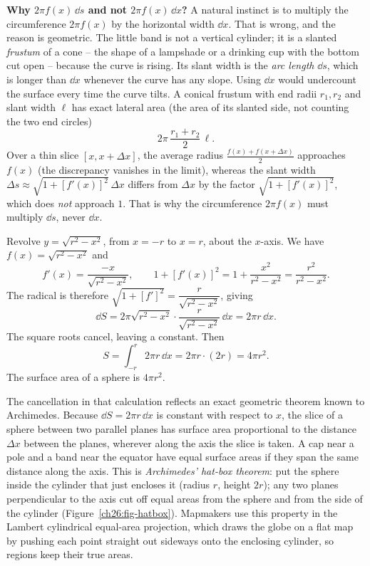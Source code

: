 \begin{whybox}
\textbf{Why $2\pi f(x)\,\dd s$ and not $2\pi f(x)\,\dd x$?} A natural instinct is
to multiply the circumference $2\pi f(x)$ by the horizontal width $\dd x$. That is
wrong, and the reason is geometric. The little band is not a vertical cylinder; it
is a slanted \emph{frustum} of a cone -- the shape of a lampshade or a drinking cup
with the bottom cut open -- because the curve is rising. Its slant width is the
\emph{arc length} $\dd s$, which is longer than $\dd x$ whenever the curve has any
slope. Using $\dd x$ would undercount the surface every time the curve tilts.
A conical frustum with end radii $r_1, r_2$ and slant width $\ell$ has exact
lateral area (the area of its slanted side, not counting the two end circles)
\[
  2\pi\,\frac{r_1+r_2}{2}\,\ell .
\]
Over a thin slice $[x, x+\Delta x]$, the
average radius $\frac{f(x)+f(x+\Delta x)}{2}$ approaches $f(x)$ (the discrepancy
vanishes in the limit), whereas the slant width $\Delta s \approx \sqrt{1+[f'(x)]^2}\,\Delta x$
differs from $\Delta x$ by the factor $\sqrt{1+[f'(x)]^2}$, which does \emph{not}
approach $1$. That is why the circumference $2\pi f(x)$ must multiply $\dd s$, never
$\dd x$.
\end{whybox}

\begin{example}
\label{ch26:ex-sphere-surface}
Revolve $y = \sqrt{r^2-x^2}$, from $x=-r$ to $x=r$, about the $x$-axis. We have
$f(x)=\sqrt{r^2-x^2}$ and
\[
  f'(x) = \frac{-x}{\sqrt{r^2-x^2}}, \qquad
  1+[f'(x)]^2 = 1 + \frac{x^2}{r^2-x^2} = \frac{r^2}{r^2-x^2}.
\]
The radical is therefore $\sqrt{1+[f']^2} = \dfrac{r}{\sqrt{r^2-x^2}}$, giving
\[
  \dd S = 2\pi\sqrt{r^2-x^2}\cdot\frac{r}{\sqrt{r^2-x^2}}\,\dd x = 2\pi r\,\dd x.
\]
The square roots cancel, leaving a constant. Then
\[
  S = \int_{-r}^{r} 2\pi r\,\dd x = 2\pi r\cdot(2r) = 4\pi r^2.
\]
The surface area of a sphere is $4\pi r^2$.
\end{example}

\begin{aestheticbox}
The cancellation in that calculation reflects an exact geometric theorem known
to Archimedes. Because $\dd S = 2\pi r\,\dd x$ is constant with respect to $x$, the
slice of a sphere between two parallel planes has surface area proportional to the
distance $\Delta x$ between the planes, wherever along the axis the slice is taken. A
cap near a pole and a band near the equator have equal surface areas if they
span the same distance along the axis. This is \emph{Archimedes' hat-box theorem}: put the
sphere inside the cylinder that just encloses it (radius $r$, height $2r$); any two planes
perpendicular to the axis cut off equal areas from the sphere and from the side of the
cylinder (Figure~\ref{ch26:fig-hatbox}). Mapmakers use this property in the Lambert
cylindrical equal-area projection, which draws the globe on a flat map by pushing each point
straight out sideways onto the enclosing cylinder, so regions keep their true areas.
\end{aestheticbox}

